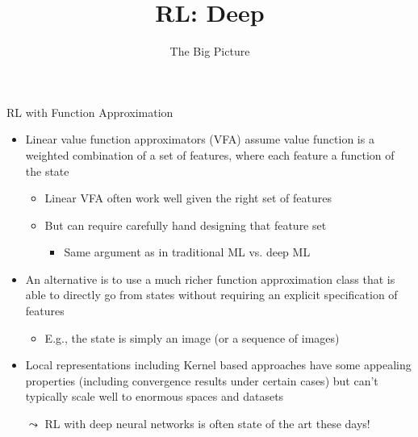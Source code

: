 


\title[RL: Deep Reinforcement Learning]{RL: Deep}
\subtitle{The Big Picture}




	
	\maketitle

\begin{frame}[c]{RL with Function Approximation}
	
	\begin{itemize}
		\item Linear value function approximators (VFA) assume value function is a weighted combination of a set of features, where each feature a function of the state
		\begin{itemize}
		\item Linear VFA often work well given the \alert{right set of features}
		\item But can require carefully hand designing that feature set
		\begin{itemize}
			\item Same argument as in traditional ML vs. deep ML
		\end{itemize}
		\end{itemize}
		\item An alternative is to use a much richer function approximation class that is able to directly go from states without requiring an explicit specification of features
		\begin{itemize}
			\item E.g., the state is simply an image (or a sequence of images)
		\end{itemize}
		\item Local representations including Kernel based approaches have some	appealing properties (including convergence results under certain	cases) but can’t typically scale well to enormous spaces and datasets
		\item[$\leadsto$] RL with deep neural networks is often state of the art these days!
	\end{itemize}

\end{frame}
